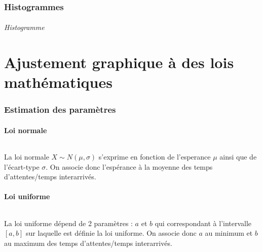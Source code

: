 \documentclass{article}
\begin{document}
\paragraph{}

\section{Histogrammes}

\paragraph{Histogramme}
\begin{center}
\end{center}
\paragraph{}

\part{Ajustement graphique à des lois mathématiques}

\section{Estimation des paramètres}

\subsection{Loi normale}
\paragraph{}
La loi normale $X \sim N(\mu,\sigma)$ s'exprime en fonction de l'esperance $\mu$ ainsi que de l'écart-type $\sigma$. On associe donc l'espérance à la moyenne des temps d'attentes/temps interarrivés.

\subsection{Loi uniforme}
\paragraph{}
La loi uniforme dépend de 2 paramètres : $a$ et $b$ qui correspondant à l'intervalle $[a,b]$ sur laquelle est définie la loi uniforme. On associe donc $a$ au minimum et $b$ au maximum des temps d'attentes/temps interarrivés.
\end{document}
